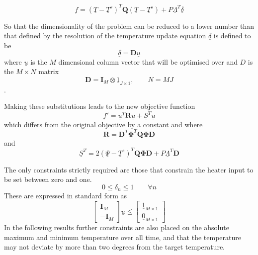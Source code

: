 \documentclass[a4paper, 10 pt, conference]{ieeeconf}  %
\begin{document}
\begin{equation}
f = (\underline{T}-\underline{T}^s)^{T}\mathbf{Q}(\underline{T}-\underline{T}^s)+P\underline{\Lambda}^{T} \underline{\delta}
\end{equation}

So that the dimensionality of the problem can be reduced to a lower number than that defined by the resolution of the temperature update equation $\underline{\delta}$ is defined to be
\begin{equation}
\underline{\delta}=\mathbf{D}\underline{u}
\end{equation}
where $\underline{u}$ is the $M$ dimensional column vector that will be optimised over and $D$ is the $M\times N$ matrix
\begin{equation}
\label{quadthermodimension}
\mathbf{D}=\mathbf{I}_{M} \otimes \underline{1}_{J \times 1},\qquad N=MJ
\end{equation}.

Making these substitutions leads to the new objective function
\begin{equation}
\label{furuus}
f'=\underline{u}^{T}\mathbf{R}\underline{u}+\underline{S}^{T}\underline{u}
\end{equation}
which differs from the original objective by a constant and where
\begin{equation}
\mathbf{R}=\mathbf{D}^{T}\boldsymbol{\Phi}^{T}\mathbf{Q}\boldsymbol{\Phi}\mathbf{D}
\end{equation}
and
\begin{equation}
\underline{S}^{T}=2(\underline{\Psi}-\underline{T}^s)^{T}\mathbf{Q}\boldsymbol{\Phi}\mathbf{D}+P\underline{\Lambda}^{T} \mathbf{D}
\end{equation}

The only constraints strictly required are those that constrain the heater input to be set between zero and one. 
\begin{equation}
0 \leq \delta_{n} \leq 1 \qquad \forall n
\end{equation}
These are expressed in standard form as
\begin{equation}
\left[
\begin{array}{c}
\mathbf{I}_{M} \\ \hline
- \mathbf{I}_{M} 
\end{array}\right]\underline{u} \leq \left[\begin{array}{c}
\underline{1}_{M \times 1} \\ \hline
\underline{0}_{M \times 1}
\end{array}\right]
\end{equation}
In the following results further constraints are also placed on the absolute maximum and minimum temperature over all time, and that the temperature may not deviate by more than two degrees from the target temperature.
\end{document}
